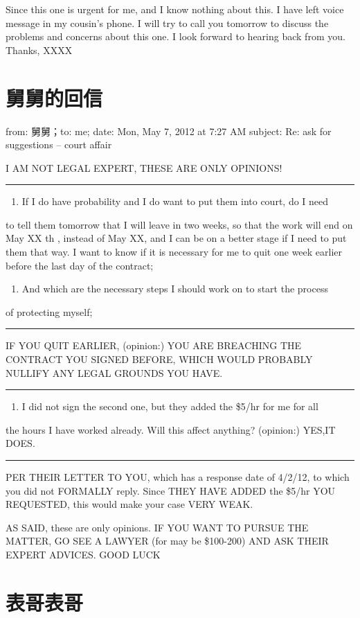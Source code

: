 \documentclass[12pt]{book}
\begin{document}
Since this one is urgent for me, and I know nothing about this. I have left 
voice message in my cousin’s phone. I will try to call you tomorrow to 
discuss the problems and concerns about this one. 
I look forward to hearing back from you. 
Thanks,
XXXX
\section{舅舅的回信}
\label{sec-9-95}

from: 舅舅；to: me;
date: Mon, May 7, 2012 at 7:27 AM 
subject: Re: ask for suggestions -- court affair

I AM NOT LEGAL EXPERT, THESE ARE ONLY OPINIONS!

\rule{\linewidth}{0.5pt}
\begin{enumerate}
\item If I do have probability and I do want to put them into court, do I need
\end{enumerate}
to tell them tomorrow that I will leave in two weeks, so that the work will 
end on May XX th , instead of May XX, and I can be on a better stage if I 
need to put them that way. I want to know if it is necessary for me to quit 
one week earlier before the last day of the contract;
\begin{enumerate}
\item And which are the necessary steps I should work on to start the process
\end{enumerate}
of protecting myself;

\rule{\linewidth}{0.5pt}
IF YOU QUIT EARLIER, (opinion:) YOU ARE BREACHING THE CONTRACT YOU SIGNED
BEFORE, WHICH WOULD PROBABLY NULLIFY ANY LEGAL GROUNDS YOU HAVE.

\rule{\linewidth}{0.5pt}
\begin{enumerate}
\item I did not sign the second one, but they added the \$5/hr for me for all
\end{enumerate}
the hours I have worked already. Will this affect anything?     (opinion:) 
YES,IT DOES.

\rule{\linewidth}{0.5pt}
PER THEIR LETTER TO YOU, which has a response date of 4/2/12,
to which you did not FORMALLY reply. Since THEY HAVE ADDED the \$5/hr
YOU REQUESTED, this would make your case VERY WEAK.

AS SAID, these are only opinions. IF YOU WANT TO PURSUE THE MATTER,
GO SEE A LAWYER (for may be \$100-200) AND ASK THEIR EXPERT ADVICES.
GOOD LUCK
\section{表哥表哥}
\label{sec-9-96}
\end{document}
